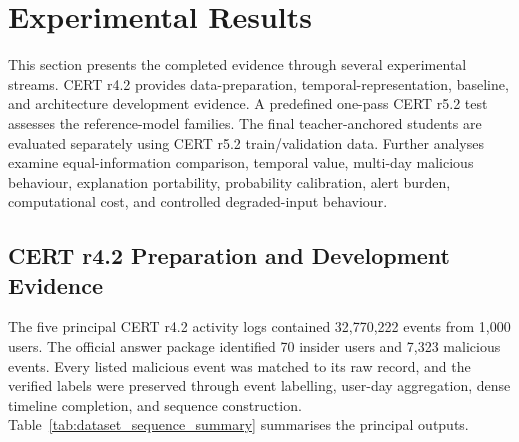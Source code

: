 \FloatBarrier
\section{Experimental Results}
\label{sec:experimental_results}
This section presents the completed evidence through several experimental
streams. CERT r4.2 provides data-preparation, temporal-representation,
baseline, and architecture development evidence. A predefined one-pass
CERT r5.2 test assesses the reference-model families. The final
teacher-anchored students are evaluated separately using CERT r5.2
train/validation data. Further analyses examine equal-information
comparison, temporal value, multi-day malicious behaviour, explanation
portability, probability calibration, alert burden, computational cost,
and controlled degraded-input behaviour.

\subsection{CERT r4.2 Preparation and Development Evidence}
\label{subsec:r42_development_results}
The five principal CERT r4.2 activity logs contained 32,770,222 events from
1,000 users. The official answer package identified 70 insider users and
7,323 malicious events. Every listed malicious event was matched to its raw
record, and the verified labels were preserved through event labelling,
user-day aggregation, dense timeline completion, and sequence construction.
Table~\ref{tab:dataset_sequence_summary} summarises the principal outputs.

